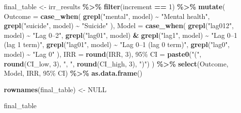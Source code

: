 \documentclass[
]{article}
\newenvironment{Shaded}{\begin{snugshade}}{\end{snugshade}}
\newcommand{\AttributeTok}[1]{\textcolor[rgb]{0.13,0.29,0.53}{#1}}
\newcommand{\ConstantTok}[1]{\textcolor[rgb]{0.56,0.35,0.01}{#1}}
\newcommand{\DecValTok}[1]{\textcolor[rgb]{0.00,0.00,0.81}{#1}}
\newcommand{\FunctionTok}[1]{\textcolor[rgb]{0.13,0.29,0.53}{\textbf{#1}}}
\newcommand{\NormalTok}[1]{#1}
\newcommand{\OtherTok}[1]{\textcolor[rgb]{0.56,0.35,0.01}{#1}}
\newcommand{\SpecialCharTok}[1]{\textcolor[rgb]{0.81,0.36,0.00}{\textbf{#1}}}
\newcommand{\StringTok}[1]{\textcolor[rgb]{0.31,0.60,0.02}{#1}}
\begin{document}
\begin{Shaded}
\begin{Highlighting}[]
\NormalTok{final\_table }\OtherTok{\textless{}{-}}\NormalTok{ irr\_results }\SpecialCharTok{\%\textgreater{}\%}
  \FunctionTok{filter}\NormalTok{(increment }\SpecialCharTok{==} \DecValTok{1}\NormalTok{) }\SpecialCharTok{\%\textgreater{}\%}
  \FunctionTok{mutate}\NormalTok{(}
    \AttributeTok{Outcome =} \FunctionTok{case\_when}\NormalTok{(}
      \FunctionTok{grepl}\NormalTok{(}\StringTok{"mental"}\NormalTok{, model) }\SpecialCharTok{\textasciitilde{}} \StringTok{"Mental health"}\NormalTok{,}
      \FunctionTok{grepl}\NormalTok{(}\StringTok{"suicide"}\NormalTok{, model) }\SpecialCharTok{\textasciitilde{}} \StringTok{"Suicide"}
\NormalTok{    ),}
    \AttributeTok{Model =} \FunctionTok{case\_when}\NormalTok{(}
      \FunctionTok{grepl}\NormalTok{(}\StringTok{"lag012"}\NormalTok{, model) }\SpecialCharTok{\textasciitilde{}} \StringTok{"Lag 0–2"}\NormalTok{,}
      \FunctionTok{grepl}\NormalTok{(}\StringTok{"lag01"}\NormalTok{, model) }\SpecialCharTok{\&} \FunctionTok{grepl}\NormalTok{(}\StringTok{"lag1"}\NormalTok{, model) }\SpecialCharTok{\textasciitilde{}} \StringTok{"Lag 0–1 (lag 1 term)"}\NormalTok{,}
      \FunctionTok{grepl}\NormalTok{(}\StringTok{"lag01"}\NormalTok{, model) }\SpecialCharTok{\textasciitilde{}} \StringTok{"Lag 0–1 (lag 0 term)"}\NormalTok{,}
      \FunctionTok{grepl}\NormalTok{(}\StringTok{"lag0"}\NormalTok{, model) }\SpecialCharTok{\textasciitilde{}} \StringTok{"Lag 0"}
\NormalTok{    ),}
    \AttributeTok{IRR =} \FunctionTok{round}\NormalTok{(IRR, }\DecValTok{3}\NormalTok{),}
    \StringTok{\textasciigrave{}}\AttributeTok{95\% CI}\StringTok{\textasciigrave{}} \OtherTok{=} \FunctionTok{paste0}\NormalTok{(}\StringTok{"("}\NormalTok{, }\FunctionTok{round}\NormalTok{(CI\_low, }\DecValTok{3}\NormalTok{), }\StringTok{", "}\NormalTok{, }\FunctionTok{round}\NormalTok{(CI\_high, }\DecValTok{3}\NormalTok{), }\StringTok{")"}\NormalTok{)}
\NormalTok{  ) }\SpecialCharTok{\%\textgreater{}\%}
  \FunctionTok{select}\NormalTok{(Outcome, Model, IRR, }\StringTok{\textasciigrave{}}\AttributeTok{95\% CI}\StringTok{\textasciigrave{}}\NormalTok{) }\SpecialCharTok{\%\textgreater{}\%}
  \FunctionTok{as.data.frame}\NormalTok{()}

\FunctionTok{rownames}\NormalTok{(final\_table) }\OtherTok{\textless{}{-}} \ConstantTok{NULL}

\NormalTok{final\_table}
\end{Highlighting}
\end{Shaded}
\end{document}
